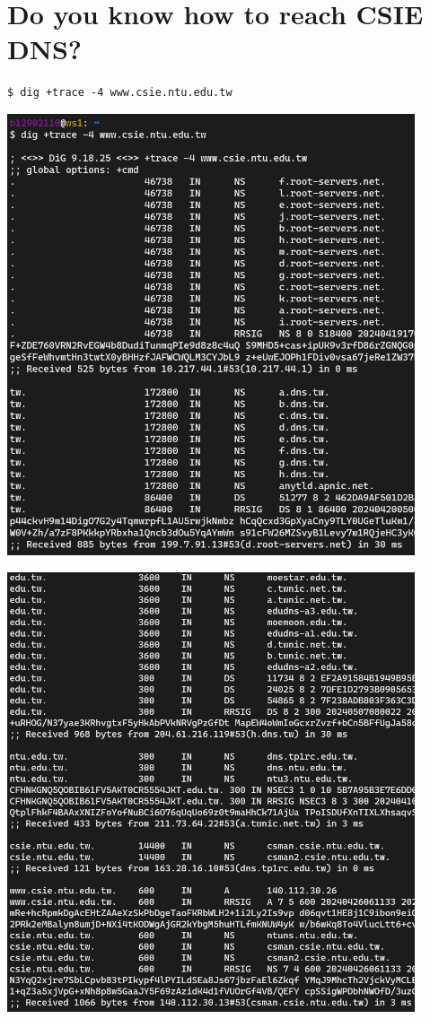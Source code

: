 \documentclass[12pt, a4paper]{article}
\begin{document}
  \pagebreak
  \section{Do you know how to reach CSIE DNS?}
  \begin{verbatim}
$ dig +trace -4 www.csie.ntu.edu.tw
  \end{verbatim}

  \includegraphics[width=0.9\textwidth]{2_dig_trace_1.png}

  \includegraphics[width=0.9\textwidth]{2_dig_trace_2.png}
\end{document}
